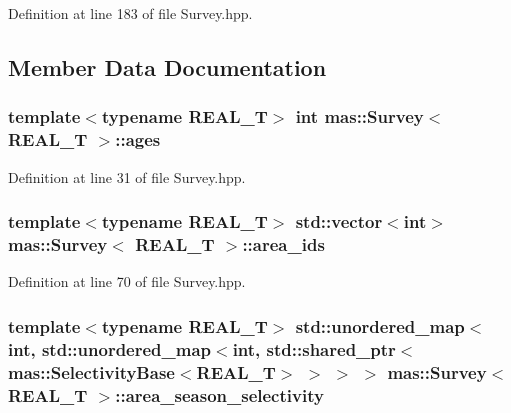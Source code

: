 Definition at line 183 of file Survey.\-hpp.



\subsection{Member Data Documentation}
\hypertarget{structmas_1_1_survey_a00478a5d1bf1272d220efde6560efe06}{
\subsubsection[{ages}]{\setlength{\rightskip}{0pt plus 5cm}template$<$typename R\-E\-A\-L\-\_\-\-T$>$ int {\bf mas\-::\-Survey}$<$ R\-E\-A\-L\-\_\-\-T $>$\-::ages}}\label{structmas_1_1_survey_a00478a5d1bf1272d220efde6560efe06}


Definition at line 31 of file Survey.\-hpp.

\hypertarget{structmas_1_1_survey_a8aeefcfbec9baeea0786200f888da11f}{
\subsubsection[{area\-\_\-ids}]{\setlength{\rightskip}{0pt plus 5cm}template$<$typename R\-E\-A\-L\-\_\-\-T$>$ std\-::vector$<$int$>$ {\bf mas\-::\-Survey}$<$ R\-E\-A\-L\-\_\-\-T $>$\-::area\-\_\-ids}}\label{structmas_1_1_survey_a8aeefcfbec9baeea0786200f888da11f}


Definition at line 70 of file Survey.\-hpp.

\hypertarget{structmas_1_1_survey_af401401f9a2b3e9ca1e37a94f04db0c4}{
\subsubsection[{area\-\_\-season\-\_\-selectivity}]{\setlength{\rightskip}{0pt plus 5cm}template$<$typename R\-E\-A\-L\-\_\-\-T$>$ std\-::unordered\-\_\-map$<$int, std\-::unordered\-\_\-map$<$int, std\-::shared\-\_\-ptr$<${\bf mas\-::\-Selectivity\-Base}$<$R\-E\-A\-L\-\_\-\-T$>$ $>$ $>$ $>$ {\bf mas\-::\-Survey}$<$ R\-E\-A\-L\-\_\-\-T $>$\-::area\-\_\-season\-\_\-selectivity}}\label{structmas_1_1_survey_af401401f9a2b3e9ca1e37a94f04db0c4}


